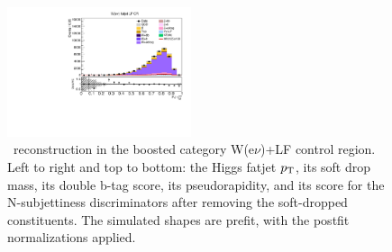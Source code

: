 \begin{figure}[tbp]
\begin{center}
    \includegraphics[width=0.48\textwidth]{figures/wlnhbb2016/boosted/WenWHLightFlavorFJCR_fj1Tau32SD.pdf}
    \caption{\HBB\ reconstruction in the boosted category W(e$\nu$)+LF control region.
    Left to right and top to bottom: the Higgs fatjet $p_{\mathrm{T}}$, its soft drop mass, its
    double b-tag score, its pseudorapidity, and its score for the N-subjettiness discriminators
    after removing the soft-dropped constituents.
    The simulated shapes are prefit, with the postfit normalizations applied.}
    \label{fig:boost_WenLF_Hbb}
  \end{center}
\end{figure}
\clearpage

